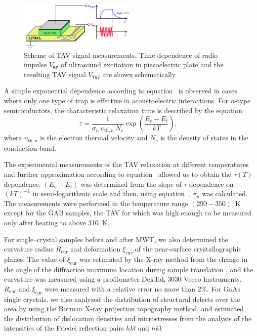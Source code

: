 \documentclass[10pt]{iopart}
\begin{document}
\begin{figure}
\includegraphics[width=0.5\textwidth]{fig2}
\caption{\label{figTAV}
Scheme of TAV signal  measurements.
Time dependence of radio impulse $V_\mathtt{RF}$ of ultrasound excitation in piezoelectric plate and the resulting TAV signal $V_\mathtt{TAV}$ are shown schematically
}%
\end{figure}

A simple exponential dependence according to equation~ is observed in cases where only one type of trap is effective in acoustoelectric interactions.
For $n$-type semiconductors, the characteristic relaxation time is described by the equation \cite{OstrovPAN,OstrovskiiSST}
\begin{equation}\label{eqPANtau}
  \tau=\frac{1}{\sigma_n\,\upsilon_{\mathrm{th},n}\,N_c}\exp\left(\frac{E_c-E_t}{kT}\right),
\end{equation}
where
$\upsilon_{\mathrm{th},n}$ is the electron thermal velocity and
$N_c$ is the density of states in the conduction band.



The experimental measurements of the TAV relaxation at different temperatures and further approximation according
to equation~
allowed us to obtain the $\tau(T)$ dependence.
$(E_c-E_t)$ was determined from the slope of $\tau$ dependence on $(kT)^{-1}$ in semi-logarithmic scale
and then, using equation~, $\sigma_n$ was calculated.
The measurements were performed in the temperature range $(290-350)$~K except for the GAB samples,
the TAV for which was high enough to be measured only after heating to above 310~K.

For single--crystal samples  before and after MWT, we also determined the curvature radius $R_\mathrm{cur}$
and deformation $\xi_\mathrm{cur}$ of the near-surface crystallographic planes.
The value of  $\xi_\mathrm{cur}$ was estimated by the X-ray method from the change in the angle of the diffraction
maximum location  during sample translation \cite{Godwod},
and the curvature was measured using a profilometer DekTak 3030 Veeco Instruments.
$R_\mathrm{cur}$ and $\xi_\mathrm{cur}$ were measured with a relative error no more than 2\%.
For GaAs single crystals, we also analyzed the distribution of structural defects
over the area by using the Borman X-ray projection topography method,
and estimated the distribution of dislocation  densities and microstresses from the
analysis of the intensities of the Friedel reflection pairs $hkl$ and $hk$\emph{\={l}}.
\end{document}
